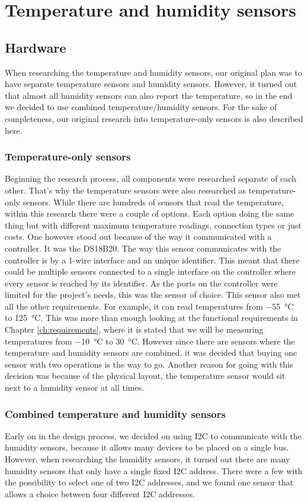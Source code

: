 \documentclass[a4paper,oneside]{book}
\begin{document}
\section{Temperature and humidity sensors}
\subsection{Hardware}
When researching the temperature and humidity sensors, our original plan was to
have separate temperature sensors and humidity sensors. However, it turned out
that almost all humidity sensors can also report the temperature, so in the end
we decided to use combined temperature/humidity sensors. For the sake of
completeness, our original research into temperature-only sensors is also
described here.

\subsubsection{Temperature-only sensors}
Beginning the research process, all components were researched separate of each
other. That's why the temperature sensors were also researched as
temperature-only sensors. While there are hundreds of sensors that read the
temperature, within this research there were a couple of options. Each option
doing the same thing but with different maximum temperature readings,
connection types or just costs. One however stood out because of the way it
communicated with a controller. It was the DS18B20. The way this sensor
communicates with the controller is by a 1-wire interface and an unique
identifier. This meant that there could be multiple sensors connected to a
single interface on the controller where every sensor is reached by its
identifier. As the ports on the controller were limited for the project's
needs, this was the sensor of choice. This sensor also met all the other
requirements. For example, it can read temperatures from \SI{-55}{\celsius} to
\SI{+125}{\celsius}. This was more than enough looking at the functional
requirements in Chapter \ref{ch:requirements}, where it is stated that we will
be measuring temperatures from \SI{-10}{\celsius} to \SI{+30}{\celsius}.
However since there are sensors where the temperature and humidity sensors are
combined, it was decided that buying one sensor with two operations is the way
to go. Another reason for going with this decision was because of the physical
layout, the temperature sensor would sit next to a humidity sensor at all
times.

\subsubsection{Combined temperature and humidity sensors}
Early on in the design process, we decided on using I2C to communicate with the
humidity sensors, because it allows many devices to be placed on a single bus.
However, when researching the humidity sensors, it turned out there are many
humidity sensors that only have a single fixed I2C address. There were a few
with the possibility to select one of two I2C addresses, and we found one
sensor that allows a choice between four different I2C addresses.
\end{document}
